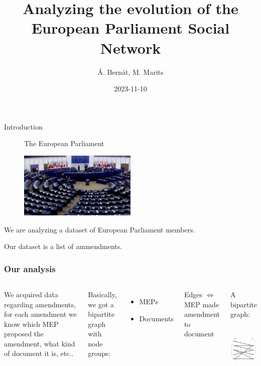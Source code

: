 \documentclass{beamer}
\title{Analyzing the evolution of the European Parliament Social Network}
\date{2023-11-10}
\author{Á. Bernát, M. Marits}
\begin{document}
\begin{frame}[plain]
    \maketitle
\end{frame}

\begin{frame}{Introduction}
	
	\begin{figure}
		The European Parliament
	
		\includegraphics[width=0.5\textwidth]{img/euparl.jpg}
	\end{figure}

	We are analyzing a dataset of European Parliament members.
	
	\vspace{2mm}
	
	Our dataset is a list of ammendments.

	
\end{frame}

\begin{frame}
\frametitle{Our analysis}

\begin{columns}

\column{5cm}

We acquired data regarding amendments, for each amendment we know which MEP proposed the amendment, what kind of document it is, etc..
\bigskip

\pause Basically, we got a bipartite graph with node groups:
\begin{itemize}
	\item MEPs
	\item Documents
\end{itemize}
\bigskip

\pause Edges $\iff$ MEP made amendment to document

\pause \column{5cm}
\begin{center}
\small{A bipartite graph:}
\bigskip
\includegraphics[height=3.2cm]{img/BipartiteGraph.png}
\end{center} 

\end{columns}
\end{frame}
\end{document}
